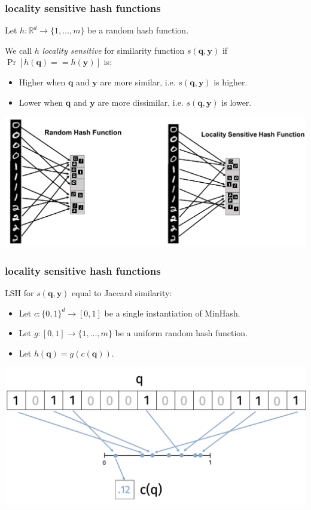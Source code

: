 \documentclass[compress]{beamer}
\newcommand{\bv}[1]{\mathbf{#1}}
\newcommand{\R}{\mathbb{R}}
\begin{document}
\begin{frame}
	\frametitle{locality sensitive hash functions}
	Let $h: \R^d \rightarrow \{1, \ldots, m\}$ be a random hash function. 
	
	We call $h$ \emph{locality sensitive} for similarity function $s(\bv{q},\bv{y})$ if $\Pr\left[h(\bv{q}) == h(\bv{y})\right]$ is:
	\begin{itemize}
		\item Higher when $\bv{q}$ and $\bv{y}$ are more similar, i.e. $s(\bv{q},\bv{y})$ is higher.
		\item Lower when $\bv{q}$ and $\bv{y}$ are more dissimilar, i.e. $s(\bv{q},\bv{y})$ is lower. 
	\end{itemize}
\begin{center}
	\includegraphics[width=.9\textwidth]{cam_lsh.png}
\end{center}
\end{frame}

\begin{frame}
	\frametitle{locality sensitive hash functions}
	LSH for $s(\bv{q},\bv{y})$  equal to Jaccard similarity:
	\begin{itemize}
		\item Let $c: \{0,1\}^d \rightarrow [0,1]$ be a single instantiation of MinHash.
		\item Let $g: [0,1] \rightarrow \{1, \ldots, m\}$ be a uniform random hash function.
		\item Let $h(\bv{q}) = g(c(\bv{q})).$
	\end{itemize}
\begin{center}
	\includegraphics[width=.7\textwidth]{single_min_hash.png}
\end{center}

\end{frame}
\end{document}
